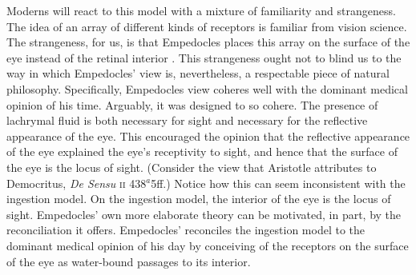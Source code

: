 Moderns will react to this model with a mixture of familiarity and strangeness. The idea of an array of different kinds of receptors is familiar from vision science. The strangeness, for us, is that Empedocles places this array on the surface of the eye instead of the retinal interior \citep[for a comparison of Empedocles' theory with modern theories of vision see][]{Siegel:1959fk}. This strangeness ought not to blind us to the way in which Empedocles' view is, nevertheless, a respectable piece of natural philosophy. Specifically, Empedocles view coheres well with the dominant medical opinion of his time. Arguably, it was designed to so cohere. The presence of lachrymal fluid is both necessary for sight and necessary for the reflective appearance of the eye. This encouraged the opinion that the reflective appearance of the eye explained the eye's receptivity to sight, and hence that the surface of the eye is the locus of sight. (Consider the view that Aristotle attributes to Democritus, \emph{De Sensu} \textsc{ii} 438\( ^{a} \)5ff.) Notice how this can seem inconsistent with the ingestion model. On the ingestion model, the interior of the eye is the locus of sight. Empedocles' own more elaborate theory can be motivated, in part, by the reconciliation it offers. Empedocles' reconciles the ingestion model to the dominant medical opinion of his day by conceiving of the receptors on the surface of the eye as water-bound passages to its interior.


